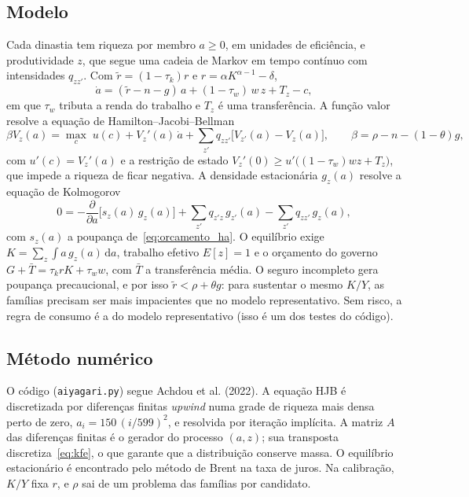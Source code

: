 \documentclass[11pt,a4paper]{article}
\newcommand{\dd}{\,\mathrm{d}}
\begin{document}
\subsection{Modelo}
Cada dinastia tem riqueza por membro $a\ge0$, em unidades de eficiência, e
produtividade $z$, que segue uma cadeia de Markov em tempo contínuo com
intensidades $q_{zz'}$. Com $\tilde r=(1-\tau_k)r$ e $r=\alpha K^{\alpha-1}-\delta$,
\begin{equation}
 \dot a=(\tilde r-n-g)\,a+(1-\tau_w)\,w\,z+T_z-c,
 \label{eq:orcamento_ha}
\end{equation}
em que $\tau_w$ tributa a renda do trabalho e $T_z$ é uma transferência. A
função valor resolve a equação de Hamilton--Jacobi--Bellman
\begin{equation}
 \beta V_z(a)=\max_c\;u(c)+V_z'(a)\,\dot a+\sum_{z'}q_{zz'}\bigl[V_{z'}(a)-V_z(a)\bigr],
 \qquad \beta=\rho-n-(1-\theta)g,
 \label{eq:hjb}
\end{equation}
com $u'(c)=V_z'(a)$ e a restrição de estado $V_z'(0)\ge u'\bigl((1-\tau_w)wz+T_z\bigr)$,
que impede a riqueza de ficar negativa. A densidade estacionária $g_z(a)$
resolve a equação de Kolmogorov
\begin{equation}
 0=-\frac{\partial}{\partial a}\bigl[s_z(a)\,g_z(a)\bigr]+\sum_{z'}q_{z'z}\,g_{z'}(a)-\sum_{z'}q_{zz'}\,g_z(a),
 \label{eq:kfe}
\end{equation}
com $s_z(a)$ a poupança de~\eqref{eq:orcamento_ha}. O equilíbrio exige
$K=\sum_z\int a\,g_z(a)\dd a$, trabalho efetivo $E[z]=1$ e o orçamento do
governo $G+\bar T=\tau_k rK+\tau_w w$, com $\bar T$ a transferência média. O
seguro incompleto gera poupança precaucional, e por isso $\tilde r<\rho+\theta g$:
para sustentar o mesmo $K/Y$, as famílias precisam ser mais impacientes que no
modelo representativo. Sem risco, a regra de consumo é a do modelo representativo
(isso é um dos testes do código).

\subsection{Método numérico}
O código (\texttt{aiyagari.py}) segue Achdou et al. (2022). A equação HJB é
discretizada por diferenças finitas \emph{upwind} numa grade de riqueza mais
densa perto de zero, $a_i=150\,(i/599)^2$, e resolvida por iteração implícita.
A matriz $A$ das diferenças finitas é o gerador do processo $(a,z)$; sua
transposta discretiza~\eqref{eq:kfe}, o que garante que a distribuição conserve
massa. O equilíbrio estacionário é encontrado pelo método de Brent na taxa de
juros. Na calibração, $K/Y$ fixa $r$, e $\rho$ sai de um problema das famílias
por candidato.
\end{document}
